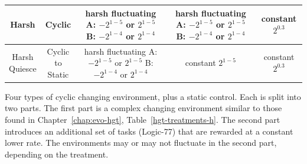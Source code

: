 \documentclass[PhD]{msu-thesis}
\begin{document}
\begin{table}[]
\begin{tabular}{|c|c||c||c|c|}
	Harsh & Cyclic & \makecell{harsh \\ fluctuating \\ A: $-2^{1-5}$ or $2^{1-5}$ \\ B: $-2^{1-4}$ or $2^{1-4}$} & \makecell{harsh \\ fluctuating \\ A: $-2^{1-5}$ or $2^{1-5}$ \\ B: $-2^{1-4}$ or $2^{1-4}$} & \makecell{constant \\ $2^{0.3}$} \\\hline

	\makecell{Harsh \\ Quiesce} & \makecell{Cyclic \\ to Static} & \makecell{harsh \\ fluctuating \\ A: $-2^{1-5}$ or $2^{1-5}$ \\ B: $-2^{1-4}$ or $2^{1-4}$} & \makecell{constant  \\ $2^{1-5}$} & \makecell{constant \\ $2^{0.3}$} \\\hline
	\end{tabular} 

	\begin{flushleft} Four types of cyclic changing environment, plus a static control. Each is split into two parts.
    The first part is a complex changing environment similar to those found in Chapter~\ref{chap:evo-hgt}, Table~\ref{hgt-treatments-h}. The second part introduces an additional set of tasks (Logic-77) that are rewarded at a constant lower rate. The environments may or may not fluctuate in the second part, depending on the treatment.
	\end{flushleft}
	\label{cel-treatments-complex}
	\end{table}
\end{document}
